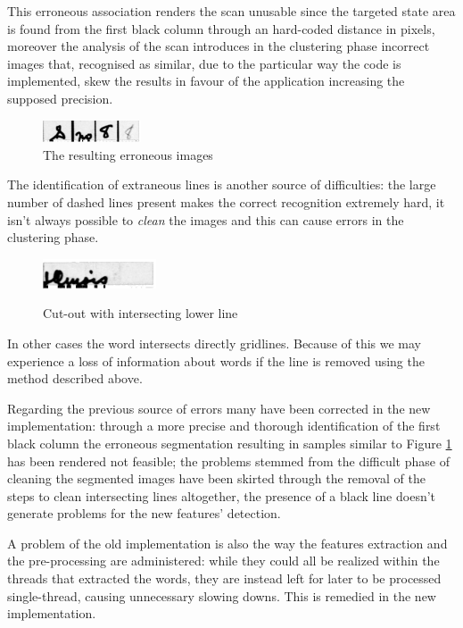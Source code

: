 This erroneous association renders the scan unusable since the targeted state area is found from the first black column through an hard-coded distance in pixels, moreover the analysis of the scan introduces in the clustering phase incorrect images that, recognised as similar, due to the particular way the code is implemented, skew the results in favour of the application increasing the supposed precision. 

\begin{figure}[!htpb]
\centering
\includegraphics[width=0.26\textwidth]{images/wrongColumn.jpg}
\caption{The resulting erroneous images}
\label{err}
\end{figure} 

The identification of extraneous lines is another source of difficulties: the large number of dashed lines present makes the correct recognition extremely hard, it isn't always possible to \emph{clean} the images and this can cause errors in the clustering phase.


\begin{figure}[!htpb]
 \centering
 \includegraphics[width=0.3\textwidth]{images/img4.jpg}
 \label{postProcessing}
  \caption{Cut-out with intersecting lower line}
 
 \end{figure}
\hspace{1mm}

In other cases the word intersects directly gridlines. Because of this we may experience a loss of information about words if the line is removed using the method described above.



Regarding the previous source of errors many have been corrected in the new implementation:
through a more precise and thorough identification of the first black column the erroneous segmentation resulting in samples similar to Figure \ref{err} has been rendered not feasible; the problems stemmed from the difficult phase of cleaning the segmented images have been skirted through the removal of the steps to clean intersecting lines altogether, the presence of a black line doesn't generate problems for the new features' detection.

A problem of the old implementation is also the way the features extraction and the pre-processing are administered: while they could all be realized within the threads that extracted the words, they are instead left for later to be processed single-thread, causing unnecessary slowing downs. This is remedied in the new implementation. 